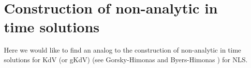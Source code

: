 \documentclass[12pt,reqno]{amsart}
\numberwithin{equation}{section}  %
\numberwithin{figure}{section}
\theoremstyle{plain}
\theoremstyle{definition}
\theoremstyle{remark}
\begin{document}
%
\section{Construction of non-analytic in time solutions} 
\label{g2-rreg}
%
%
Here we would like to find an analog to the construction
 of non-analytic in time solutions for KdV (or gKdV)
 (see  Gorsky-Himonas \cite{Gorsky:2005fk} and Byers-Himonas
 \cite{Byers-2006-Existence-time-for-the-Camassa-Holm})
 for NLS. 
 
 








%
%
%
%
%
%
%
%
%
\end{document}
